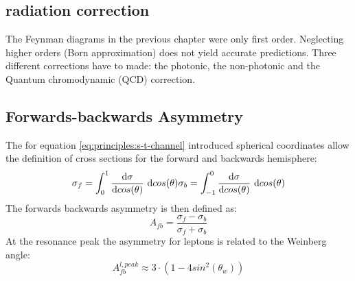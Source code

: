 \subsection{radiation correction}
The Feynman diagrams in the previous chapter were only first order. Neglecting higher orders (Born approximation) does not yield accurate predictions\cite{muenchen}. Three different corrections have to made: the photonic, the non-photonic and the Quantum chromodynamic (QCD) correction.
\subsection{Forwards-backwards Asymmetry}
The for equation \ref{eq:principles:s-t-channel} introduced spherical coordinates allow the definition of cross sections for the forward and backwards hemisphere:
\begin{equation}
\sigma_f=\int_{0}^{1}\frac{\text{d}\sigma}{\text{d}cos(\theta)}~\text{d}cos(\theta) \\
\sigma_b=\int_{-1}^{0}\frac{\text{d}\sigma}{\text{d}cos(\theta)}~\text{d}cos(\theta)
\end{equation}
The forwards backwards asymmetry is then defined as:
\begin{equation}
A_{fb}=\frac{\sigma_f-\sigma_b}{\sigma_f+\sigma_b}
\label{eq:principles:asymmetry definition}
\end{equation}
At the resonance peak the asymmetry for leptons is related to the Weinberg angle\cite{muenchen}:
\begin{equation}
A_{fb}^{l,peak}\approx 3\cdot (1-4 sin^2(\theta_w))
\label{eq:principles:asymmetry weinberg angle}
\end{equation}